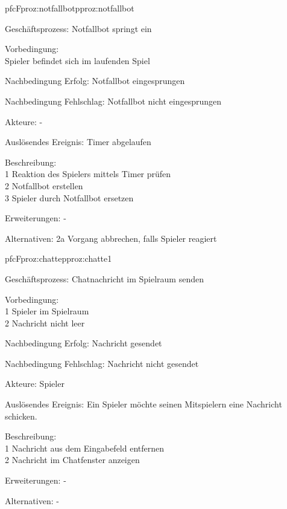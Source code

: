 \begin{description}[leftmargin=3em, style=sameline]
	\begin{php}{pfc}{F}{proz:notfallbot}{pproz:notfallbot}
		\item [Geschäftsprozess:] Notfallbot springt ein
		\item [Vorbedingung:]\hfill\\
		Spieler befindet sich im laufenden Spiel
		\item [Nachbedingung Erfolg:] Notfallbot eingesprungen
		\item [Nachbedingung Fehlschlag:] Notfallbot nicht eingesprungen
		\item [Akteure:] -
		\item [Auslösendes Ereignis:]  Timer abgelaufen
		\item [Beschreibung:]\hfill\\
		1 Reaktion des Spielers mittels Timer prüfen \\
		2 Notfallbot erstellen \\
		3 Spieler durch Notfallbot ersetzen
		\item [Erweiterungen:] -
		\item [Alternativen:] 2a Vorgang abbrechen, falls Spieler reagiert
	\end{php}
	
	\begin{php}{pfc}{F}{proz:chatte}{pproz:chatte1}
		\item [Geschäftsprozess:] Chatnachricht im Spielraum senden
		\item [Vorbedingung:]\hfill\\
		1 Spieler im Spielraum \\
		2 Nachricht nicht leer
		\item [Nachbedingung Erfolg:] Nachricht gesendet
		\item [Nachbedingung Fehlschlag:] Nachricht nicht gesendet
		\item [Akteure:] Spieler
		\item [Auslösendes Ereignis:] Ein Spieler möchte seinen Mitspielern eine Nachricht schicken.
		\item [Beschreibung:] \hfill\\
		1 Nachricht aus dem Eingabefeld entfernen \\
		2 Nachricht im Chatfenster anzeigen
		\item [Erweiterungen:] -
		\item [Alternativen:] -
	\end{php}
	

\end{description}
